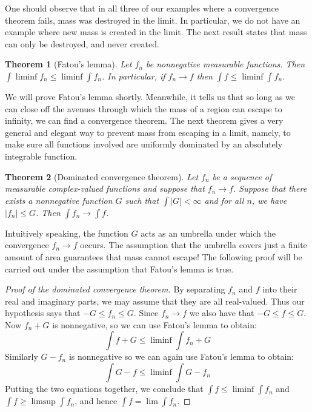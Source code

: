 \documentclass[11pt,oneside]{amsbook}
\theoremstyle{definition}
\theoremstyle{plain}
\newtheorem{thm}{Theorem}[section]
\theoremstyle{definition}
\theoremstyle{remark}
\numberwithin{equation}{section}
\numberwithin{figure}{section}
\begin{document}
One should observe that in all three of our examples where a convergence theorem fails, mass was destroyed in the limit. In particular, we do not have an example where new mass is created in the limit. The next result states that mass can only be destroyed, and never created.

\begin{thm}[Fatou's lemma]
  Let $f_n$ be nonnegative measurable functions. Then $\int\liminf f_n\leq\liminf\int f_n$. In particular, if $f_n\to f$ then $\int f\leq\liminf\int f_n$.
\end{thm}

We will prove Fatou's lemma shortly. Meanwhile, it tells us that so long as we can close off the avenues through which the mass of a region can escape to infinity, we can find a convergence theorem. The next theorem gives a very general and elegant way to prevent mass from escaping in a limit, namely, to make sure all functions involved are uniformly dominated by an absolutely integrable function.

\begin{thm}[Dominated convergence theorem]
  Let $f_n$ be a sequence of measurable complex-valued functions and suppose that $f_n\to f$. Suppose that there exists a nonnegative function $G$ such that $\int|G|<\infty$ and for all $n$, we have $|f_n|\leq G$. Then $\int f_n\to \int f$.
\end{thm}

Intuitively speaking, the function $G$ acts as an umbrella under which the convergence $f_n\to f$ occurs. The assumption that the umbrella covers just a finite amount of area guarantees that mass cannot escape! The following proof will be carried out under the assumption that Fatou's lemma is true.

\begin{proof}[Proof of the dominated convergence theorem]
  By separating $f_n$ and $f$ into their real and imaginary parts, we may assume that they are all real-valued. Thus our hypothesis says that $-G\leq f_n\leq G$. Since $f_n\to f$ we also have that $-G\leq f\leq G$. Now $f_n+G$ is nonnegative, so we can use Fatou's lemma to obtain:
  \[\int f+G\leq\liminf\int f_n+G
  \]
  Similarly $G-f_n$ is nonnegative so we can again use Fatou's lemma to obtain:
  \[\int G-f\leq\liminf\int G-f_n
  \]
  Putting the two equations together, we conclude that $\int f\leq\liminf\int f_n$ and $\int f\geq\limsup\int f_n$, and hence $\int f=\lim\int f_n$.
\end{proof}
\end{document}
